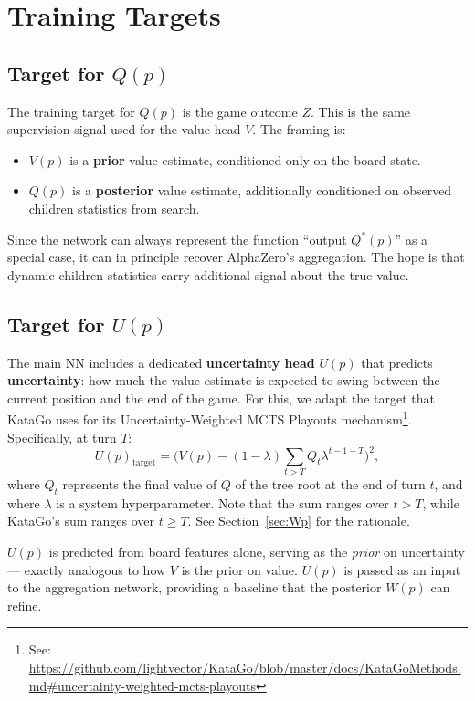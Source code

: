 \documentclass[11pt]{article}
\begin{document}
\section{Training Targets}

\subsection{Target for $Q(p)$}

The training target for $Q(p)$ is the game outcome $Z$. This is the same
supervision signal used for the value head $V$. The framing is:

\begin{itemize}[noitemsep]
  \item $V(p)$ is a \textbf{prior} value estimate, conditioned only on the
        board state.
  \item $Q(p)$ is a \textbf{posterior} value estimate, additionally
        conditioned on observed children statistics from search.
\end{itemize}

Since the network can always represent the function ``output $Q^*(p)$'' as a
special case, it can in principle recover AlphaZero's aggregation. The
hope is that dynamic children statistics carry additional signal about the
true value.

\subsection{Target for $U(p)$}
\label{sec:U}

The main NN includes a dedicated \textbf{uncertainty head} $U(p)$ that
predicts \textbf{uncertainty}: how much the value estimate is
expected to swing between the current position and the end of the game.
For this, we adapt the target that KataGo uses for its Uncertainty-Weighted MCTS
Playouts mechanism\footnote{See: \url{https://github.com/lightvector/KataGo/blob/master/docs/KataGoMethods.md\#uncertainty-weighted-mcts-playouts}}.
Specifically, at turn $T$:
\[
  U(p)_{\text{target}} = \bigl(V(p) - (1-\lambda)\sum_{t > T} Q_{t}\lambda^{t-1-T}\bigr)^2,
\]
where $Q_t$ represents the final value of $Q$ of the tree root at the end of
turn $t$, and where $\lambda$ is a system hyperparameter. Note that the sum ranges over $t > T$, while KataGo's sum ranges
over $t \geq T$. See Section~\ref{sec:Wp} for the rationale.

$U(p)$ is predicted from board features alone, serving as the \emph{prior}
on uncertainty --- exactly analogous to how $V$ is the prior on value.
$U(p)$ is passed as an input to the aggregation network, providing a baseline
that the posterior $W(p)$ can refine.
\end{document}
